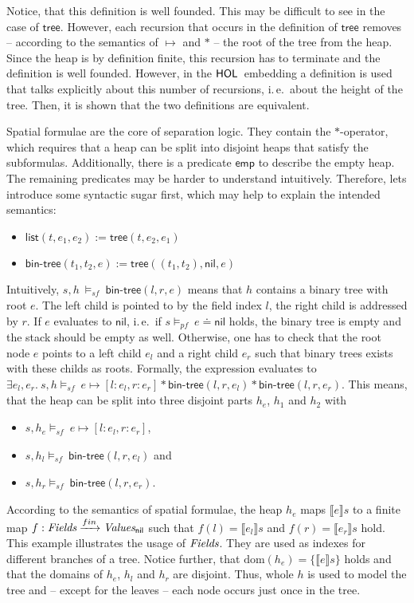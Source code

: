 \documentclass{scrartcl}
\theoremstyle{definition}
\newcommand{\HOL}{{\sf HOL}}
\newcommand{\nil}{{\textsf{nil}}}
\newcommand{\pfequal}[2]{\ensuremath{#1 \doteq #2}}
\newcommand{\values}{{\emph{Values}}}
\newcommand{\valuesnil}{\ensuremath{\values_\nil}}
\newcommand{\fields}{{\emph{Fields}}}
\newcommand{\modelspf}{{\models_{\textit{pf}}\ }}
\newcommand{\modelssf}{{\models_{\textit{sf}}\ }}
\newcommand{\sfemp}{{\textsf{emp}}}
\newcommand{\sftree}{{\textsf{tree}}}
\newcommand{\sfpointsto}[2]{#1 \mapsto [#2]}
\newcommand{\sfbintree}{{\textsf{bin-tree}}}
\newcommand{\sflist}{{\textsf{list}}}
\newcommand{\dom}{{\text{dom}}}
\newcommand{\tofin}{\xrightarrow{fin}}
\begin{document}
Notice, that this definition is well founded. This may be difficult to see in
the case of $\sftree$. However, each recursion that occurs in the definition
of $\sftree$ removes -- according to the semantics of $\mapsto$ and
$*$ -- the root of the tree from the heap. Since the heap is by definition
finite, this recursion has to terminate and the definition is well founded.
However, in the $\HOL$\ embedding a definition is used that talks explicitly
about this number of recursions, i.\,e.\ about the height of the tree. Then, it
is shown that the two definitions are equivalent.
\bigskip

Spatial formulae are the core of separation logic. They contain the
$*$-operator, which requires that a heap can be split into disjoint heaps
that satisfy the subformulas. Additionally, there is a predicate $\sfemp$ to
describe the empty heap. The remaining predicates may be harder to understand
intuitively. Therefore, lets introduce some syntactic sugar first, which may
help to explain the intended semantics:

\begin{itemize}
\item $\sflist(t,e_1,e_2) := \sftree(t,e_2,e_1)$
\item $\sfbintree(t_1,t_2,e) := \sftree((t_1,t_2),\nil,e)$
\end{itemize}

Intuitively, $s, h\ \modelssf \sfbintree(l,r,e)$ means that $h$ contains a
binary tree with root $e$. The left child is pointed to by the field
index $l$, the right child is addressed by $r$. If $e$ evaluates to $\nil$,
i.\,e.\ if $s \modelspf \pfequal e \nil$ holds, the binary tree is empty and
the stack should be empty as well. Otherwise, one has to check
that the root node $e$ points to a left child $e_l$ and a right child $e_r$ such that
binary trees exists with these childs as roots. Formally, the expression evaluates to
$\exists e_l,e_r.\ s, h \modelssf \sfpointsto{e}{l:e_l, r:e_r} *
\sfbintree(l,r,e_l) * \sfbintree(l,r,e_r)$. This means, that the heap can be
split into three disjoint parts $h_e$, $h_1$ and $h_2$ with
\begin{itemize}
  \item $s, h_e \modelssf \sfpointsto{e}{l:e_l, r:e_r}$,
  \item $s, h_l \modelssf \sfbintree(l,r,e_l)$ and
  \item $s, h_r \modelssf \sfbintree(l,r,e_r)$.
\end{itemize}
According to the semantics of spatial formulae, the heap $h_e$ maps $\llbracket e
\rrbracket s$ to a finite map $f:\fields \tofin \valuesnil$ such that
$f(l) = \llbracket e_l \rrbracket s$ and $f(r) = \llbracket e_r \rrbracket
s$ hold. This example illustrates the usage of $\fields$. They are used
as indexes for different branches of a tree. Notice further, that $\dom(h_e) =
\{\llbracket e \rrbracket s\}$ holds and that the domains of $h_e$, $h_l$ and $h_r$
are disjoint. Thus, whole $h$ is used to model the tree and -- except for the
leaves -- each node occurs just once in the tree.
\end{document}
